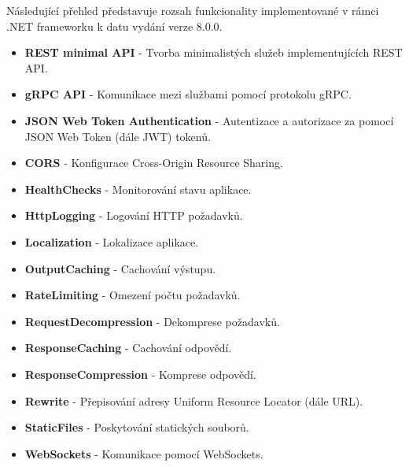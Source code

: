
Následující přehled představuje rozsah funkcionality implementované v rámci .NET frameworku k datu vydání verze 8.0.0. \cite{aspnetdocs}

\begin{itemize}
    \item \textbf{REST minimal API} - Tvorba minimalistých služeb implementujících REST API.
    \item \textbf{gRPC API} - Komunikace mezi službami pomocí protokolu gRPC.
    \item \textbf{JSON Web Token Authentication} - Autentizace a autorizace za pomocí JSON Web Token (dále JWT) tokenů.
    \item \textbf{CORS} - Konfigurace Cross-Origin Resource Sharing.
    \item \textbf{HealthChecks} - Monitorování stavu aplikace.
    \item \textbf{HttpLogging} - Logování HTTP požadavků.
    \item \textbf{Localization} - Lokalizace aplikace.
    \item \textbf{OutputCaching} - Cachování výstupu.
    \item \textbf{RateLimiting} - Omezení počtu požadavků.
    \item \textbf{RequestDecompression} - Dekomprese požadavků.
    \item \textbf{ResponseCaching} - Cachování odpovědí.
    \item \textbf{ResponseCompression} - Komprese odpovědí.
    \item \textbf{Rewrite} - Přepisování adresy Uniform Resource Locator (dále URL).
    \item \textbf{StaticFiles} - Poskytování statických souborů.
    \item \textbf{WebSockets} - Komunikace pomocí WebSockets.
\end{itemize}
